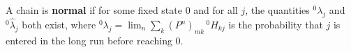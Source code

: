 A chain is \textbf{normal} if for some fixed state 0 and for all $j$, the quantities $^0\lambda_j$ and $^0\hat{\lambda}_j$ both exist, where $^0\lambda_j = \lim_n \sum_k (P^n)_{mk} \, ^0H_{kj}$ is the probability that $j$ is entered in the long run before reaching 0.